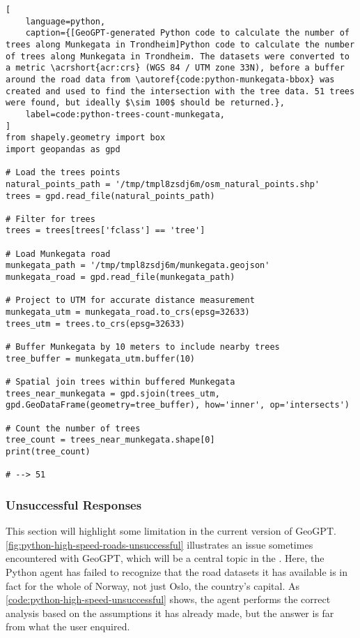 \begin{lstlisting}[
    language=python,
    caption={[GeoGPT-generated Python code to calculate the number of trees along Munkegata in Trondheim]Python code to calculate the number of trees along Munkegata in Trondheim. The datasets were converted to a metric \acrshort{acr:crs} (WGS 84 / UTM zone 33N), before a buffer around the road data from \autoref{code:python-munkegata-bbox} was created and used to find the intersection with the tree data. 51 trees were found, but ideally $\sim 100$ should be returned.},
    label=code:python-trees-count-munkegata,
]
from shapely.geometry import box
import geopandas as gpd

# Load the trees points
natural_points_path = '/tmp/tmpl8zsdj6m/osm_natural_points.shp'
trees = gpd.read_file(natural_points_path)

# Filter for trees
trees = trees[trees['fclass'] == 'tree']

# Load Munkegata road
munkegata_path = '/tmp/tmpl8zsdj6m/munkegata.geojson'
munkegata_road = gpd.read_file(munkegata_path)

# Project to UTM for accurate distance measurement
munkegata_utm = munkegata_road.to_crs(epsg=32633)
trees_utm = trees.to_crs(epsg=32633)

# Buffer Munkegata by 10 meters to include nearby trees
tree_buffer = munkegata_utm.buffer(10)

# Spatial join trees within buffered Munkegata
trees_near_munkegata = gpd.sjoin(trees_utm, gpd.GeoDataFrame(geometry=tree_buffer), how='inner', op='intersects')

# Count the number of trees
tree_count = trees_near_munkegata.shape[0]
print(tree_count)

# --> 51
\end{lstlisting}

\FloatBarrier
\newpage

\subsubsection{Unsuccessful Responses}
\label{subsubsec:unsuccessful-responses}

This section will highlight some limitation in the current version of GeoGPT. \autoref{fig:python-high-speed-roads-unsuccessful} illustrates an issue sometimes encountered with GeoGPT, which will be a central topic in the . Here, the Python agent has failed to recognize that the road datasets it has available is in fact for the whole of Norway, not just Oslo, the country's capital. As \autoref{code:python-high-speed-unsuccessful} shows, the agent performs the correct analysis based on the assumptions it has already made, but the answer is far from what the user enquired.

